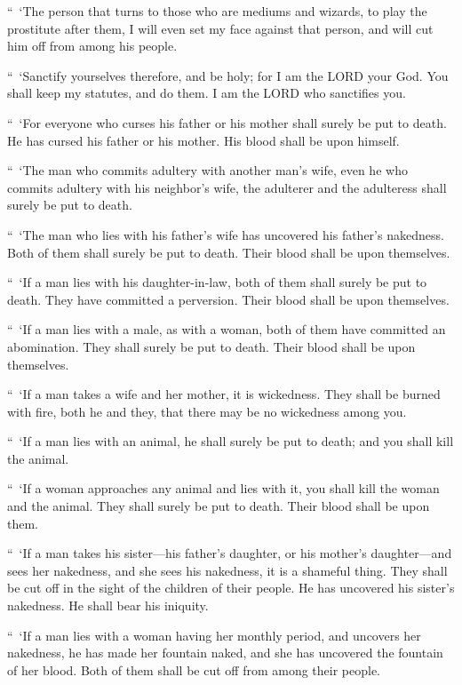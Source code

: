 \myverse{}“ ‘The person that turns to those who are mediums and wizards,
to play the prostitute after them, I will even set my face against that person, and will cut him off from
among his people.


\myverse{}“ ‘Sanctify yourselves therefore, and be holy; for I am the LORD
your God.
\myverse{}You shall keep my statutes, and do them. I am the LORD who sanctifies you.


\myverse{}“ ‘For everyone who curses his father or his mother shall surely
be put to death. He has cursed his father or his mother. His blood shall be upon himself.


\myverse{}“ ‘The man who commits adultery with another man’s wife, even
he who commits adultery with his neighbor’s wife, the adulterer and the adulteress shall surely be put
to death.


\myverse{}“ ‘The man who lies with his father’s wife has uncovered his
father’s nakedness. Both of them shall surely be put to death. Their blood shall be upon themselves.


\myverse{}“ ‘If a man lies with his daughter-in-law, both of them shall
surely be put to death. They have committed a perversion. Their blood shall be upon themselves.


\myverse{}“ ‘If a man lies with a male, as with a woman, both of them have
committed an abomination. They shall surely be put to death. Their blood shall be upon themselves.


\myverse{}“ ‘If a man takes a wife and her mother, it is wickedness. They
shall be burned with fire, both he and they, that there may be no wickedness among you.


\myverse{}“ ‘If a man lies with an animal, he shall surely be put to death;
and you shall kill the animal.


\myverse{}“ ‘If a woman approaches any animal and lies with it, you shall
kill the woman and the animal. They shall surely be put to death. Their blood shall be upon them.


\myverse{}“ ‘If a man takes his sister—his father’s daughter, or his mother’s
daughter—and sees her nakedness, and she sees his nakedness, it is a shameful thing. They shall be cut
off in the sight of the children of their people. He has uncovered his sister’s nakedness. He shall bear
his iniquity.


\myverse{}“ ‘If a man lies with a woman having her monthly period, and
uncovers her nakedness, he has made her fountain naked, and she has uncovered the fountain of her blood.
Both of them shall be cut off from among their people.


